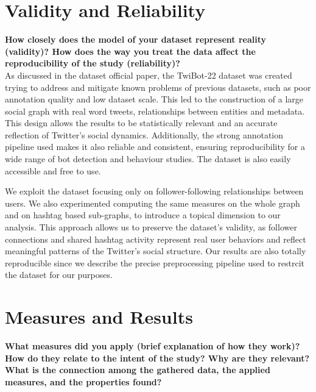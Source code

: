 \documentclass[12pt, a4paper]{article}
\begin{document}
\section{Validity and Reliability}
	\label{validity-and-reliability-not-needed-for-the-project-proposal}
	
	\textbf{How closely does the model of your dataset represent reality (validity)? How does the way you treat the data affect the reproducibility of the study (reliability)?}\\
	
   As discussed in the dataset official paper, the TwiBot-22 dataset was created trying to address and mitigate known problems of previous datasets, such as poor annotation quality and low dataset scale. This led to the construction of a large social graph with real word tweets, relationships between entities and metadata. This design allows the results to be statistically relevant and an accurate reflection of Twitter’s social dynamics. Additionally, the strong annotation pipeline used makes it also reliable and consistent, ensuring reproducibility for a wide range of bot detection and behaviour studies. The dataset is also easily accessible and free to use.
	
    We exploit the dataset focusing only on follower-following relationships between users. We also experimented computing the same measures on the whole graph and on hashtag based sub-graphs, to introduce a topical dimension to our analysis. This approach allows us to preserve the dataset’s validity, as follower connections and shared hashtag activity represent real user behaviors and reflect meaningful patterns of the Twitter’s social structure. Our results are also totally reproducible since we describe the precise preprocessing pipeline used to restrcit the dataset for our purposes.


\section{Measures and Results}
	\label{measures}
	
	\textbf{What measures did you apply (brief explanation of how they work)? How do they relate to the intent of the study? Why are they relevant? What is the connection among the gathered data, the applied measures, and the properties found?}\\
	
\end{document}
